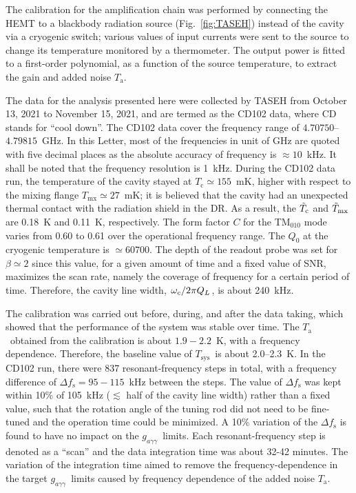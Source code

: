 \documentclass[%
 reprint,prl, %
superscriptaddress,
nobibnotes,
 amsmath,amssymb,
 aps,
]{revtex4-2}
\newcommand{\bgagg}{\ensuremath{g_{a\gamma\gamma}}}
\newcommand{\tsys}{\ensuremath{T_\text{sys}}}
\newcommand{\ta}{\ensuremath{T_\text{a}}}
\newcommand{\flo}{\ensuremath{4.70750}}
\newcommand{\fhi}{\ensuremath{4.79815}}
\newcommand{\noise}{\ensuremath{1.9 - 2.2}}
\begin{document}
The calibration for the amplification chain was performed by 
connecting the HEMT to a blackbody radiation source (Fig.~\ref{fig:TASEH}) 
instead of the cavity via a cryogenic switch; 
various values of input currents were sent to the 
source to change its temperature monitored by a thermometer. 
The output power is fitted to a first-order polynomial, as a function of
the source temperature, to extract the gain and added noise \ta.


The data for the analysis presented here were collected by TASEH 
from October 13, 2021 to November 15, 2021, and are termed as the CD102 data, 
where CD stands for ``cool down''. 
The CD102 data cover the frequency range of \flo--\fhi~GHz. In this Letter, 
most of the frequencies in unit of GHz are quoted with five decimal places as 
the absolute accuracy of frequency is $\approx 10$~kHz. It shall be noted 
that the frequency resolution is 1~kHz.  
During the CD102 data run, 
the temperature of the cavity stayed at $T_\text{c}\simeq155$~mK, higher 
with respect to the mixing flange $T_\text{mx}\simeq27$~mK; it is believed 
that the cavity had an 
unexpected thermal contact with the radiation shield in the DR. 
As a result, the $\Tilde{T}_\text{c}$ and $\Tilde{T}_\text{mx}$ 
are 0.18~K and 0.11~K, respectively. 
The form factor $C$ for 
the TM$_{010}$ mode varies from 0.60 to 0.61 over the operational 
frequency range. 
The $Q_0$ at the cryogenic temperature is $\simeq 60700$. 
The depth of the readout probe was set for 
$\beta\simeq2$ since this value, for a given amount 
of time and a fixed value of SNR, maximizes the scan rate,  
namely the coverage of frequency for a certain period of time. 
Therefore, 
the cavity line width, $\left.\omega_c\middle/2\pi Q_L\right.$, is about 
240~kHz. 

The calibration was carried out before, during, and after the data taking,
which showed that the performance of the system was stable over time. 
The \ta\ obtained from the calibration is 
about \noise~K, with a frequency dependence. Therefore, the baseline value 
of \tsys\ is about 2.0--2.3~K. In the CD102 run, 
there were 837 resonant-frequency steps in total, with a frequency difference 
of $\Delta f_\text{s}=95-115$~kHz between the steps. The value of 
$\Delta f_\text{s}$ was kept within 10\% of 105~kHz ($\lesssim$ half of the 
cavity line width) rather than 
a fixed value, such that the rotation angle of the tuning rod did not need to 
be fine-tuned and the operation time could be minimized. A 10\% variation of 
the $\Delta f_\text{s}$ is found to have no impact on the \bgagg\ limits. 
Each resonant-frequency step is denoted as a ``scan'' 
and the data integration time was about 32-42 minutes. %
The variation of the integration 
time aimed to remove the frequency-dependence in the target \bgagg\ limits 
caused by frequency dependence of the added noise \ta. 
\end{document}
